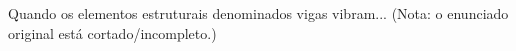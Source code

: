 Quando os elementos estruturais denominados vigas vibram... (Nota: o enunciado original está cortado/incompleto.)


